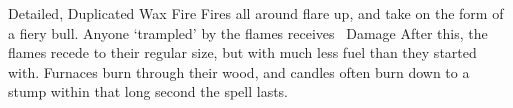   {Detailed, Duplicated}%
  {Wax}%
  {Fire}%
  {}%
  {Fires all around flare up, and take on the form of a fiery bull.
  Anyone `trampled' by the flames receives \showDam\ Damage}%
  {After this, the flames recede to their regular size, but with much less fuel than they started with.
  Furnaces burn through their wood, and candles often burn down to a stump within that long second the spell lasts.}

